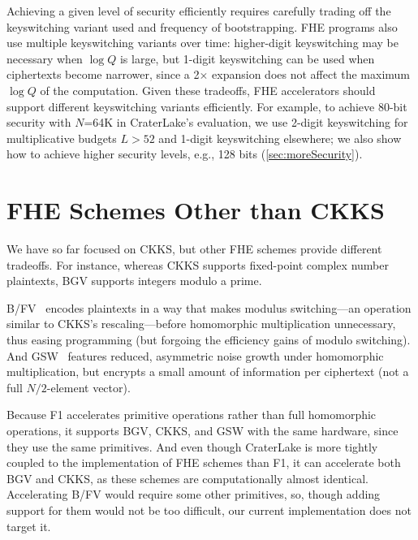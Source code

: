 Achieving a given level of security efficiently requires carefully trading off
the keyswitching variant used and frequency of bootstrapping. FHE programs also
use multiple keyswitching variants over time: higher-digit keyswitching may be
necessary when $\log Q$ is large, but 1-digit keyswitching can be used when
ciphertexts become narrower, since a 2$\times$ expansion does not affect the
maximum $\log Q$ of the computation. Given these tradeoffs, FHE accelerators
should support different keyswitching variants efficiently. For example, to
achieve 80-bit security with $N$=64K in CraterLake's evaluation, we use 2-digit
keyswitching for multiplicative budgets $L>52$ and 1-digit keyswitching
elsewhere; we also show how to achieve higher security levels, e.g., 128 bits
(\autoref{sec:moreSecurity}).

\section{FHE Schemes Other than CKKS}
\label{sec:fhe_others}

We have so far focused on CKKS, but other FHE schemes provide different
tradeoffs. For instance, whereas CKKS supports fixed-point complex number
plaintexts, BGV supports integers modulo a prime.

B/FV~\cite{brakerski:crypto12:fully,fan:iacr12:somewhat} encodes plaintexts in
a way that makes modulus switching---an operation similar to CKKS's
rescaling---before homomorphic multiplication unnecessary, thus easing
programming (but forgoing the efficiency gains of modulo switching). And
GSW~\cite{gentry:crypto13:homomorphic} features reduced, asymmetric noise
growth under homomorphic multiplication, but encrypts a small amount of
information per ciphertext (not a full $N/2$-element vector).

Because F1 accelerates primitive operations rather than full homomorphic
operations, it supports BGV, CKKS, and GSW with the same hardware, since they
use the same primitives. And even though CraterLake is more tightly coupled to
the implementation of FHE schemes than F1, it can accelerate both BGV and CKKS,
as these schemes are computationally almost identical. Accelerating B/FV would
require some other primitives, so, though adding support for them would not be
too difficult, our current implementation does not target it.
